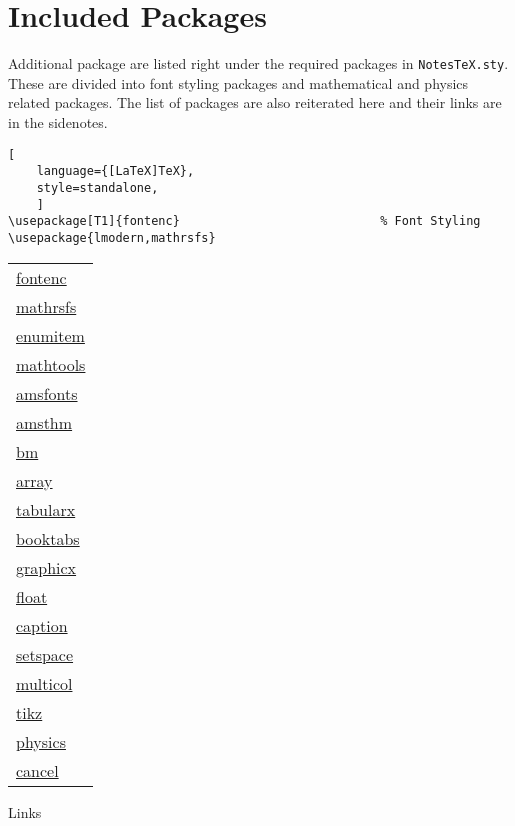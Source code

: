 \documentclass[10pt]{article}
\begin{document}
	\section{Included Packages} %
	\label{sec:incpackage}
	Additional package are listed right under the required packages in \texttt{NotesTeX.sty}.
	These are divided into font styling packages and mathematical and physics related packages.
	The list of packages are also reiterated here and their links are in the sidenotes.
	\begin{lstlisting}[
	language={[LaTeX]TeX},
	style=standalone,
	]
\usepackage[T1]{fontenc}                            % Font Styling
\usepackage{lmodern,mathrsfs}
	\end{lstlisting}
	\begin{margintable}\footnotesize
		\begin{tabularx}{\marginparwidth}{|X}
			\href{https://www.ctan.org/pkg/fontenc}{fontenc}\\
			\href{https://www.ctan.org/pkg/mathrsfs}{mathrsfs}\\
			\href{https://www.ctan.org/pkg/enumitem}{enumitem}\\
			\href{https://www.ctan.org/pkg/mathtools}{mathtools}\\
			\href{https://www.ctan.org/pkg/amsfonts}{amsfonts}\\
			\href{https://www.ctan.org/pkg/amsthm}{amsthm}\\
			\href{https://www.ctan.org/pkg/bm}{bm}\\
			\href{https://www.ctan.org/pkg/array}{array}\\
			\href{https://www.ctan.org/pkg/tabularx}{tabularx}\\
			\href{https://www.ctan.org/pkg/booktabs}{booktabs}\\
			\href{https://www.ctan.org/pkg/graphicx}{graphicx}\\
			\href{https://www.ctan.org/pkg/float}{float}\\
			\href{https://www.ctan.org/pkg/caption}{caption}\\
			\href{https://www.ctan.org/pkg/setspace}{setspace}\\
			\href{https://www.ctan.org/pkg/multicol}{multicol}\\
			\href{https://www.ctan.org/topic/pgf-tikz}{tikz}\\
			\href{https://www.ctan.org/pkg/physics}{physics}\\
			\href{https://www.ctan.org/pkg/cancel}{cancel}
		\end{tabularx}
		\caption{Links}
	\end{margintable}
\end{document}
